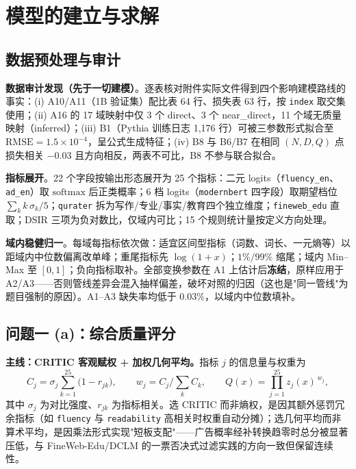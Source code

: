 \section{模型的建立与求解}

\subsection{数据预处理与审计}\label{sec:prep}

\textbf{数据审计发现（先于一切建模）}。逐表核对附件实际文件得到四个影响建模路线的事实：(i) A10/A11（1B 验证集）配比表 64 行、损失表 63 行，按 \texttt{index} 取交集使用；(ii) A16 的 17 域映射中仅 3 个 direct、3 个 near\_direct，11 个域无质量映射（inferred）；(iii) B1（Pythia 训练日志 1{,}176 行）可被三参数形式拟合至 $\mathrm{RMSE}=1.5\times10^{-4}$，呈公式生成特征；(iv) B8 与 B6/B7 在相同 $(N,D,Q)$ 点损失相关 $-0.03$ 且方向相反，两表不可比，B8 不参与联合拟合。

\textbf{指标展开}。22 个字段按输出形态展开为 25 个指标：二元 logits（\texttt{fluency\_en}、\texttt{ad\_en}）取 $\mathrm{softmax}$ 后正类概率；6 档 logits（\texttt{modernbert} 四字段）取期望档位 $\sum_k k\,\sigma_k/5$；\texttt{qurater} 拆为写作/专业/事实/教育四个独立维度；\texttt{fineweb\_edu} 直取；DSIR 三项为负对数比，仅域内可比；15 个规则统计量按定义方向处理。

\textbf{域内稳健归一}。每域每指标依次做：适宜区间型指标（词数、词长、一元熵等）以距域内中位数偏离改单峰；重尾指标先 $\log(1+x)$；$1\%/99\%$ 缩尾；域内 Min--Max 至 $[0,1]$；负向指标取补。全部变换参数在 A1 上估计后\textbf{冻结}，原样应用于 A2/A3——否则管线差异会混入抽样偏差，破坏对照的归因（这也是"同一管线"为题目强制的原因）。A1--A3 缺失率均低于 $0.03\%$，以域内中位数填补。

\subsection{问题一 (a)：综合质量评分}\label{sec:m1a}

\textbf{主线：CRITIC 客观赋权 + 加权几何平均。}指标 $j$ 的信息量与权重为
\begin{equation}
C_j=\sigma_j\sum_{k=1}^{25}\bigl(1-r_{jk}\bigr),\qquad
w_j=C_j\Big/\sum_k C_k,\qquad
Q(x)=\prod_{j=1}^{25} z_j(x)^{\,w_j},
\label{eq:critic}
\end{equation}
其中 $\sigma_j$ 为对比强度、$r_{jk}$ 为指标相关。选 CRITIC 而非熵权，是因其额外惩罚冗余指标（如 \texttt{fluency} 与 \texttt{readability} 高相关时权重自动分摊）；选几何平均而非算术平均，是因乘法形式实现"短板支配"——广告概率经补转换趋零时总分被显著压低，与 FineWeb-Edu/DCLM 的一票否决式过滤实践的方向一致但保留连续性。

